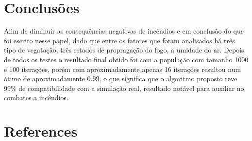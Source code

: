\documentclass[12pt]{article}
\begin{document}
\section{Conclusões}
Afim de diminuir as consequências negativas de incêndios e em conclusão do que foi escrito nesse papel, dado que entre os fatores que foram analisados há três tipo de vegatação, três estados de propragação do fogo, a umidade do ar.
Depois de todos os testes o resultado final obtido foi com a população com tamanho 1000 e 100 iterações, porém com aproximadamente apenas 16 iterações resultou num ótimo de aproximadamente 0.99, o que significa que o algoritmo proposto teve 99\% de compatibilidade com a simulação real, resultado notável para auxiliar no combates a incêndios.

\section{References}




\end{document}
